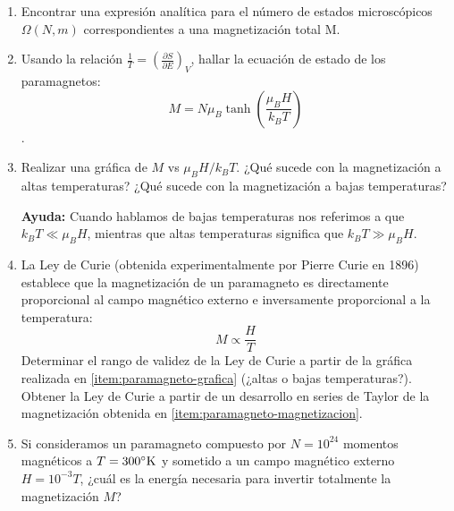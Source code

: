 \documentclass[a4paper,11pt]{article}
\begin{document}
\begin{enumerate}[label=(\alph*),
                  leftmargin=2\parindent,
                  rightmargin=2\parindent]

    \item{Encontrar una expresión analítica para el número de 
          estados microscópicos $\Omega(N, m)$ correspondientes a una 
          magnetización total M.
          }
    
    \item{\label{item:paramagneto-magnetizacion}
          Usando la relación
          $\frac{1}{T} = \left( \frac{\partial S}{\partial E} \right)_V$,
          hallar la ecuación de estado de los paramagnetos:
          $$ M = N \mu_B \tanh \left( \frac{\mu_B H}{k_B T} \right) $$.
          }
    
    \item{\label{item:paramagneto-grafica}
          Realizar una gráfica de $M$ vs $\mu_B H/k_B T$.
          ¿Qué sucede con la magnetización a altas temperaturas?
          ¿Qué sucede con la magnetización a bajas temperaturas?
          }
    
    {\small
    \textbf{Ayuda:} Cuando hablamos de bajas temperaturas nos referimos 
    a que $k_B T \ll \mu_B H$, mientras que altas temperaturas 
    significa que $k_B T \gg \mu_B H$.
    }

    \item{La Ley de Curie (obtenida experimentalmente por Pierre Curie en 1896)
          establece que la magnetización de un paramagneto es 
          directamente proporcional al campo magnético externo e 
          inversamente proporcional a la temperatura:
          $$ M \propto \frac{H}{T} $$
          Determinar el rango de validez de la Ley de Curie a partir de la
          gráfica realizada en \ref{item:paramagneto-grafica}
          (¿altas o bajas temperaturas?).\\
          Obtener la Ley de Curie a partir de un desarrollo en series 
          de Taylor de la magnetización obtenida en 
          \ref{item:paramagneto-magnetizacion}.
          }
    
    \item{Si consideramos un paramagneto compuesto por $N = 10^{24}$ 
          momentos magnéticos a $T = 300 \rm{^\circ K}$ y sometido a un 
          campo magnético externo $H = 10^{-3} T$,
          ¿cuál es la energía necesaria para invertir totalmente la 
          magnetización $M$?
          }

\end{enumerate}
\end{document}
